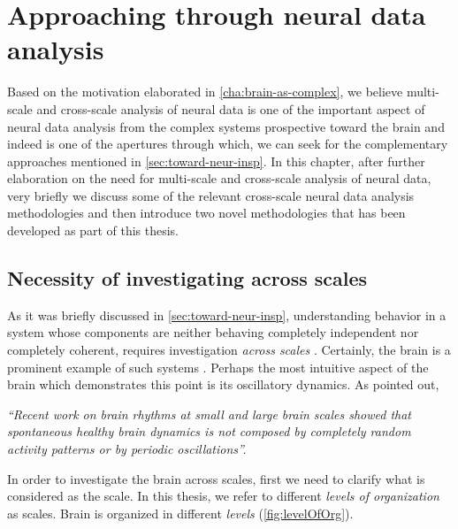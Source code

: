 \chapter{Approaching through neural data analysis}\label{cha:appr-thro-nda}

Based on the motivation elaborated in \autoref{cha:brain-as-complex},
we believe multi-scale and cross-scale analysis of neural data is one of the important aspect of neural data analysis from the complex systems prospective toward the brain
and indeed is one of the apertures through which,
we can seek for  the complementary approaches mentioned in \autoref{sec:toward-neur-insp}.
In this chapter, after further elaboration on the need for multi-scale and cross-scale analysis of neural data,
very briefly we discuss some of the relevant cross-scale neural data 
analysis methodologies and then introduce two novel methodologies that has been developed as part of this thesis.

\section{Necessity of investigating across scales}\label{sec:necess-invest-across}

As it was briefly discussed in \autoref{sec:toward-neur-insp},
understanding behavior in a system whose components  are neither behaving completely independent nor completely coherent, 
requires investigation \emph{across scales} \cite{bar-yamWhyComplexityDifferent2017,einevollScientificCaseBrain2019}.
Certainly, the brain is a prominent example of such systems \cite{einevollScientificCaseBrain2019}.
Perhaps the most intuitive aspect of the brain which demonstrates this point is its oscillatory dynamics.
As  pointed out, 
\begin{displayquote}\textsl{
    ``Recent work on brain rhythms at small and large brain scales showed that spontaneous healthy brain dynamics is not composed by completely random activity patterns or by periodic oscillations\cite{buzsakiRhythmsBrain2011}''.
  }
\end{displayquote}


In order to investigate the brain across scales,
first we need to clarify what is considered as the scale.
In this thesis, we refer to different \emph{levels of organization} as scales.
Brain is organized in different \emph{levels}
(\autoref{fig:levelOfOrg}).

